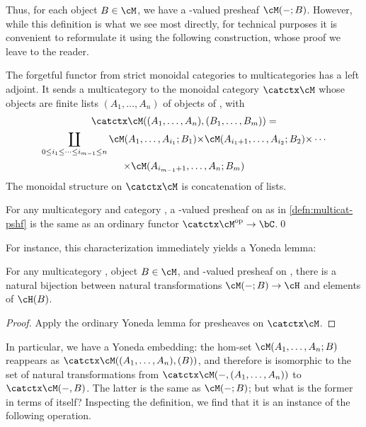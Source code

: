 Thus, for each object $B\in\cM$, we have a \bSet-valued presheaf $\cM(-;B)$.
However, while this definition is what we see most directly, for technical purposes it is convenient to reformulate it using the following construction, whose proof we leave to the reader.

\begin{thm}\label{thm:catctx}
  The forgetful functor from strict monoidal categories to multicategories has a left adjoint.
  It sends a multicategory \cM to the monoidal category $\catctx\cM$ whose objects are finite lists $(A_1,\dots,A_n)$ of objects of \cM, with
  \begin{multline*}
    \catctx\cM((A_1,\dots,A_n),(B_1,\dots,B_m))=\\
    \coprod_{0\le i_1 \le \cdots \le i_{m-1} \le n}
    \cM(A_1,\dots,A_{i_1}; B_1) \times \cM(A_{i_1+1},\dots,A_{i_2};B_2) \times \cdots \\
    \times \cM(A_{i_{m-1}+1},\dots,A_n;B_m)
  \end{multline*}
  The monoidal structure on $\catctx\cM$ is concatenation of lists.
\end{thm}

\begin{thm}\label{thm:multicat-pshf-catctx}
  For any multicategory \cM and category \bC, a \bC-valued presheaf on \cM as in \cref{defn:multicat-pshf} is the same as an ordinary functor $\catctx\cM\op \to \bC$.\qed
\end{thm}

For instance, this characterization immediately yields a Yoneda lemma:

\begin{cor}\label{thm:multicat-yoneda}
  For any multicategory \cM, object $B\in\cM$, and \bSet-valued presheaf \cH on \cM, there is a natural bijection between natural transformations $\cM(-;B) \to \cH$ and elements of $\cH(B)$.
\end{cor}
\begin{proof}
  Apply the ordinary Yoneda lemma for presheaves on $\catctx\cM$.
\end{proof}

In particular, we have a Yoneda embedding: the hom-set $\cM(A_1,\dots,A_n;B)$ reappears as $\catctx\cM((A_1,\dots,A_n),(B))$, and therefore is isomorphic to the set of natural transformations from $\catctx\cM(-,(A_1,\dots,A_n))$ to $\catctx\cM(-,B)$.
The latter is the same as $\cM(-;B)$; but what is the former in terms of \cM itself?
Inspecting the definition, we find that it is an instance of the following operation.

